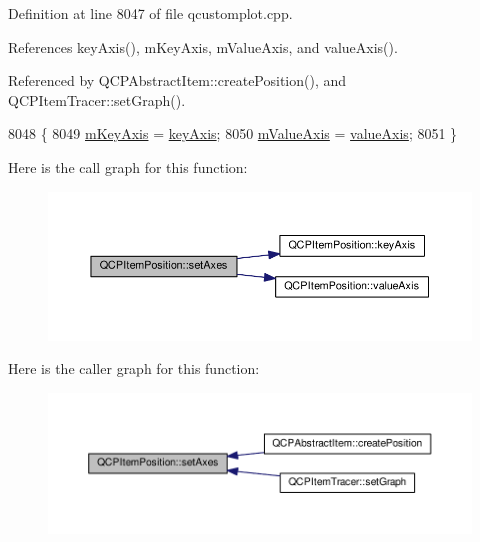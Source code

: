Definition at line 8047 of file qcustomplot.\+cpp.



References key\+Axis(), m\+Key\+Axis, m\+Value\+Axis, and value\+Axis().



Referenced by Q\+C\+P\+Abstract\+Item\+::create\+Position(), and Q\+C\+P\+Item\+Tracer\+::set\+Graph().


\begin{DoxyCode}
8048 \{
8049   \hyperlink{class_q_c_p_item_position_a63967a33933231e92f68c8ce06bfc37e}{mKeyAxis} = \hyperlink{class_q_c_p_item_position_ab99de7ae5766d246defb2de9f47eaf51}{keyAxis};
8050   \hyperlink{class_q_c_p_item_position_a505dc2da24ba274452c1c817fcaba011}{mValueAxis} = \hyperlink{class_q_c_p_item_position_a8d3a039fb2e69df86b4015daa30dfd2d}{valueAxis};
8051 \}
\end{DoxyCode}


Here is the call graph for this function\+:\nopagebreak
\begin{figure}[H]
\begin{center}
\leavevmode
\includegraphics[width=350pt]{class_q_c_p_item_position_a2185f45c75ac8cb9be89daeaaad50e37_cgraph}
\end{center}
\end{figure}




Here is the caller graph for this function\+:\nopagebreak
\begin{figure}[H]
\begin{center}
\leavevmode
\includegraphics[width=350pt]{class_q_c_p_item_position_a2185f45c75ac8cb9be89daeaaad50e37_icgraph}
\end{center}
\end{figure}


